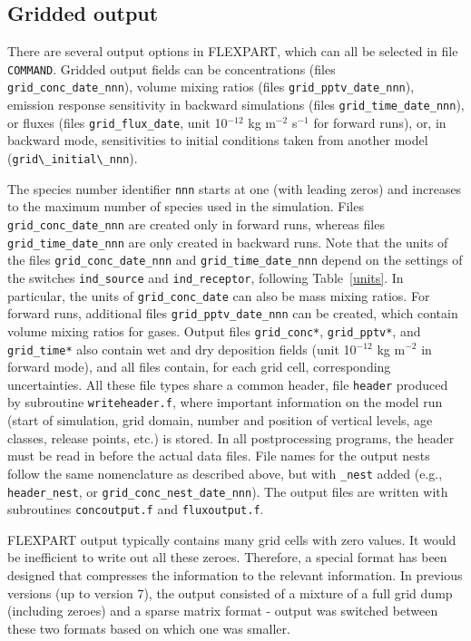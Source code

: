 \documentclass{egu}            %
\begin{document}
\subsection{Gridded output}

There are several output options in FLEXPART, which can all be selected in file
\verb|COMMAND|.  Gridded output fields can be concentrations (files
\verb|grid_conc_date_nnn|), volume mixing ratios (files
\verb|grid_pptv_date_nnn|), emission response sensitivity in backward
simulations (files \verb|grid_time_date_nnn|), or fluxes (files
\verb|grid_flux_date|, unit 10$^{-12}$ kg m$^{-2}$ s$^{-1}$ for forward runs),
or, in backward mode, sensitivities to initial conditions taken from another
model (\verb|grid\_initial\_nnn|).

The species number identifier \verb|nnn| starts at one (with leading zeros) and
increases to the maximum number of species used in the simulation.  Files
\verb|grid_conc_date_nnn| are created only in forward runs, whereas files
\verb|grid_time_date_nnn| are only created in backward runs.  Note that the
units of the files \verb|grid_conc_date_nnn| and \verb|grid_time_date_nnn|
depend on the settings of the switches \verb|ind_source| and
\verb|ind_receptor|, following Table~\ref{units}.  In particular, the units of
\verb|grid_conc_date| can also be mass mixing ratios.  For forward runs,
additional files \verb|grid_pptv_date_nnn| can be created, which contain volume
mixing ratios for gases.  Output files \verb|grid_conc*|, \verb|grid_pptv*|,
and \verb|grid_time*| also contain wet and dry deposition fields (unit
10$^{-12}$ kg m$^{-2}$ in forward mode), and all files contain, for each grid
cell, corresponding uncertainties.  All these file types share a common header,
file \verb|header| produced by subroutine \verb|writeheader.f|, where important
information on the model run (start of simulation, grid domain, number and
position of vertical levels, age classes, release points, etc.) is stored.  In
all postprocessing programs, the header must be read in before the actual data
files.  File names for the output nests follow the same nomenclature as
described above, but with \verb|_nest| added (e.g., \verb|header_nest|, or
\verb|grid_conc_nest_date_nnn|).  The output files are written with subroutines
\verb|concoutput.f| and \verb|fluxoutput.f|.

FLEXPART output typically contains many grid cells with zero values.  It would
be inefficient to write out all these zeroes.  Therefore, a special format has
been designed that compresses the information to the relevant information.  In
previous versions (up to version 7), the output consisted of a mixture of a
full grid dump (including zeroes) and a sparse matrix format - output was
switched between these two formats based on which one was smaller.
\end{document}
